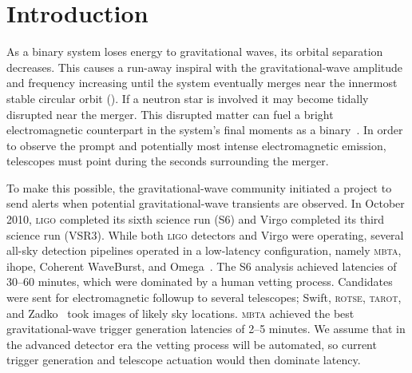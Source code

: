 \section{Introduction}
\label{sec:introduction}


%
\begin{comment}
The coalescence of compact binary systems consisting of neutron stars (NS)
and/or black holes (BH) is the most promising source of gravitational radiation
for Advanced \LIGO~\cite{ALIGOWeb}, Virgo~\cite{AVirgoWeb}, \GEO~\cite{GEOWeb}, and
\LCGT~\cite{LCGTWeb}.  Tens of
binary coalescence events are expected to be observed in the
advanced detector era later this decade~\cite{Abadie:2010p10836}.
\end{comment}

As a binary system loses energy to gravitational waves, its orbital separation
decreases. This causes a run-away inspiral with the gravitational-wave
amplitude and frequency increasing until the system eventually merges near the
innermost stable circular orbit (\ISCO).  If a neutron star is involved it may become tidally disrupted near the merger.
This disrupted matter can fuel a bright electromagnetic
counterpart in the system's final moments as a binary~\cite{shibata:2007}.
In order to observe the prompt and
potentially most intense electromagnetic emission, telescopes must point during the seconds surrounding the
merger.

 To make this possible, the gravitational-wave community initiated a project to send alerts when
potential gravitational-wave transients are observed.  In October 2010, \textsc{ligo} completed its sixth science run (S6) and Virgo
completed its third science run (VSR3).  While both \textsc{ligo} detectors and Virgo were
operating, several all-sky detection pipelines operated in a low-latency
configuration, namely \textsc{mbta}, ihope, Coherent WaveBurst, and Omega~\cite{HugheyGWPAW2011, S6lowlatency}.  The S6 analysis achieved latencies of 30--60 minutes, which were
dominated by a human vetting process. Candidates were sent for
electromagnetic followup to several telescopes; Swift,
\textsc{rotse}, \textsc{tarot}, and Zadko~\cite{kanner2008, HugheyGWPAW2011} took images of likely sky locations.  \textsc{mbta} achieved the best gravitational-wave trigger
generation latencies of 2--5 minutes.  We assume that
in the advanced detector era the vetting process will be automated, so current
trigger generation and telescope actuation would then dominate latency.

